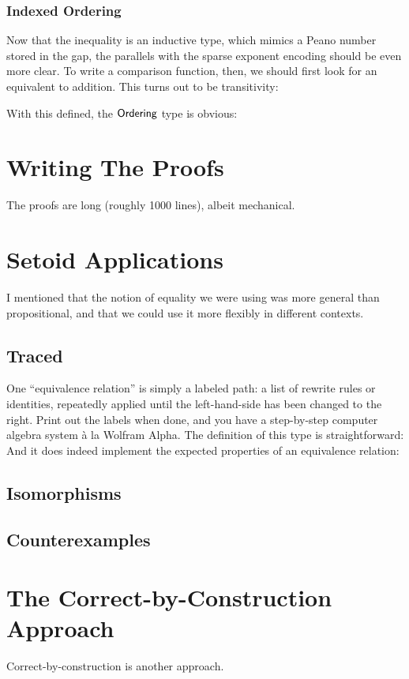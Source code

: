 \documentclass[draft, twocolumn]{article}
\begin{document}
\subsubsection{Indexed Ordering}
Now that the inequality is an inductive type, which mimics a Peano number stored
in the gap, the parallels with the sparse exponent encoding should be even more
clear. To write a comparison function, then, we should first look for an
equivalent to addition. This turns out to be transitivity:

With this defined, the \(\AgdaDatatype{Ordering}\) type is obvious:

\section{Writing The Proofs}
The proofs are long (roughly 1000 lines), albeit mechanical. 
\section{Setoid Applications} \label{setoid-applications}
I mentioned that the notion of equality we were using was more general than
propositional, and that we could use it more flexibly in different contexts.
\subsection{Traced}
One ``equivalence relation'' is simply a labeled path: a list of rewrite rules
or identities, repeatedly applied until the left-hand-side has been changed to
the right. Print out the labels when done, and you have a step-by-step computer
algebra system à la Wolfram Alpha. The definition of this type is
straightforward:
And it does indeed implement the expected properties of an equivalence relation:
\subsection{Isomorphisms}
\subsection{Counterexamples}
\section{The Correct-by-Construction Approach}
Correct-by-construction is another approach\cite{geuvers_automatically_2017}.
\begin{figure*}[!h]
\end{figure*}


\end{document}
